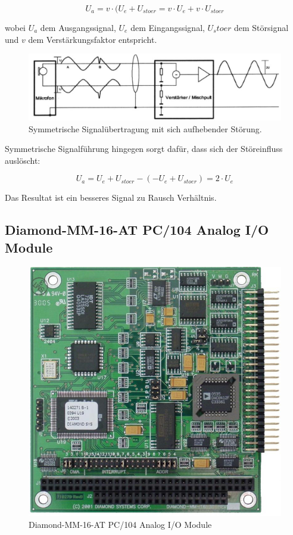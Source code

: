 \documentclass[12pt,a4paper]{scrartcl}
\begin{document}
\begin{equation}
U_a = v \cdot (U_e + U_{stoer} = v \cdot U_e + v \cdot U_{stoer}
\end{equation}

wobei $U_a$ dem Ausgangssignal, $U_e$ dem Eingangssignal, $U_stoer$ dem Störsignal und $v$ dem Verstärkungsfaktor entspricht.

\begin{figure}[H]
\centering
\includegraphics[scale=.7]{symmetrisch.png}
\caption{Symmetrische Signalübertragung mit sich aufhebender Störung. \citep{Sengpiel:2001fk}}
\label{symmetrisch}
\end{figure}

Symmetrische Signalführung hingegen sorgt dafür, dass sich der Störeinfluss auslöscht:

\begin{equation}
U_a = U_e + U_{stoer} - ( -U_e + U_{stoer} ) = 2 \cdot U_e
\end{equation}

Das Resultat ist ein besseres Signal zu Rausch Verhältnis.


\subsection{Diamond-MM-16-AT PC/104 Analog I/O Module}

\begin{figure}[H]
\centering
\includegraphics[scale=.4]{hardwareimages/diamondmm16at.jpg}
\caption{Diamond-MM-16-AT PC/104 Analog I/O Module}
\label{diamond}
\end{figure}
\end{document}
